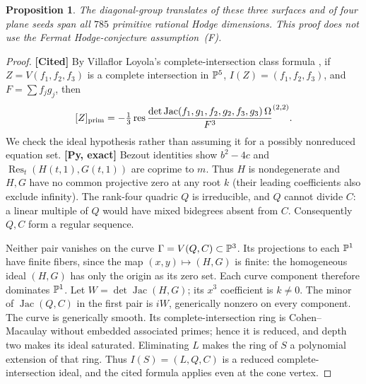 \documentclass[11pt]{amsart}
\newtheorem{proposition}[theorem]{Proposition}
\theoremstyle{remark}\newtheorem{remark}[theorem]{Remark}
\begin{document}
\begin{proposition}\label{prop:explicit-residue}
The diagonal-group translates of these three surfaces and of four plane
seeds span all $785$ primitive rational Hodge dimensions. This proof does
not use the Fermat Hodge-conjecture assumption~(F).
\end{proposition}
\begin{proof}
\textbf{[Cited]} By Villaflor Loyola's complete-intersection class formula
\cite[Theorem~1.1]{VL}, if $Z=V(f_1,f_2,f_3)$ is a complete intersection
in $\mathbb{P}^5$, $I(Z)=(f_1,f_2,f_3)$, and $F=\sum f_jg_j$, then
\[
 [Z]_{\rm prim}=-\tfrac13\operatorname{res}
 \frac{\det\operatorname{Jac}(f_1,g_1,f_2,g_2,f_3,g_3)\,\Omega}{F^3}^{(2,2)}.
\]
We check the ideal hypothesis rather than assuming it for a possibly
nonreduced equation set. \textbf{[Py, exact]} Bezout identities show
$b^2-4c$ and $\operatorname{Res}_t(H(t,1),G(t,1))$ are coprime to $m$.
Thus $H$ is nondegenerate and $H,G$ have no common projective zero at
any root $k$ (their leading coefficients also exclude infinity).
The rank-four quadric $Q$ is irreducible, and $Q$ cannot divide $C$:
a linear multiple of $Q$ would have mixed bidegrees absent from $C$.
Consequently $Q,C$ form a regular sequence.

Neither pair vanishes on the curve $\Gamma=V(Q,C)\subset\mathbb{P}^3$.
Its projections to each $\mathbb{P}^1$ have finite fibers, since the map
$(x,y)\mapsto(H,G)$ is finite: the homogeneous ideal $(H,G)$ has only
the origin as its zero set. Each curve component therefore dominates
$\mathbb{P}^1$. Let $W=\det\operatorname{Jac}(H,G)$; its $x^3$ coefficient is
$k\ne0$. The minor of $\operatorname{Jac}(Q,C)$ in the first pair is
$iW$, generically nonzero on every component. The curve is generically
smooth. Its complete-intersection ring is Cohen--Macaulay without embedded
associated primes; hence it is reduced, and depth two makes its ideal
saturated. Eliminating $L$ makes the ring of $S$ a polynomial extension
of that ring. Thus $I(S)=(L,Q,C)$ is a reduced complete-intersection
ideal, and the cited formula applies even at the cone vertex.


\end{proof}
\end{document}
